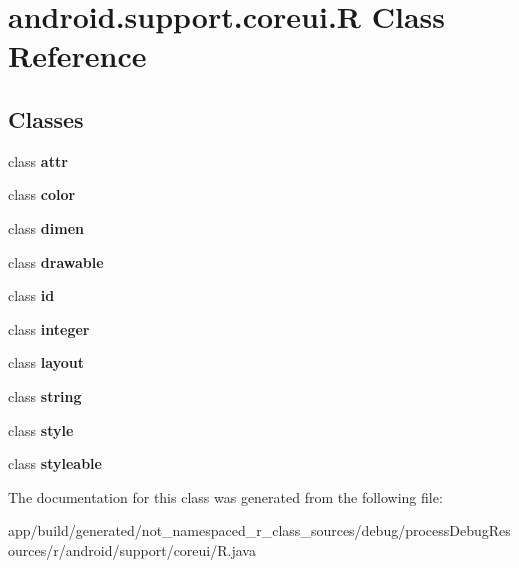 \hypertarget{classandroid_1_1support_1_1coreui_1_1_r}{}\section{android.\+support.\+coreui.\+R Class Reference}
\label{classandroid_1_1support_1_1coreui_1_1_r}
\subsection*{Classes}
\begin{DoxyCompactItemize}
\item 
class {\bfseries attr}
\item 
class {\bfseries color}
\item 
class {\bfseries dimen}
\item 
class {\bfseries drawable}
\item 
class {\bfseries id}
\item 
class {\bfseries integer}
\item 
class {\bfseries layout}
\item 
class {\bfseries string}
\item 
class {\bfseries style}
\item 
class {\bfseries styleable}
\end{DoxyCompactItemize}


The documentation for this class was generated from the following file\+:\begin{DoxyCompactItemize}
\item 
app/build/generated/not\+\_\+namespaced\+\_\+r\+\_\+class\+\_\+sources/debug/process\+Debug\+Resources/r/android/support/coreui/R.\+java\end{DoxyCompactItemize}
